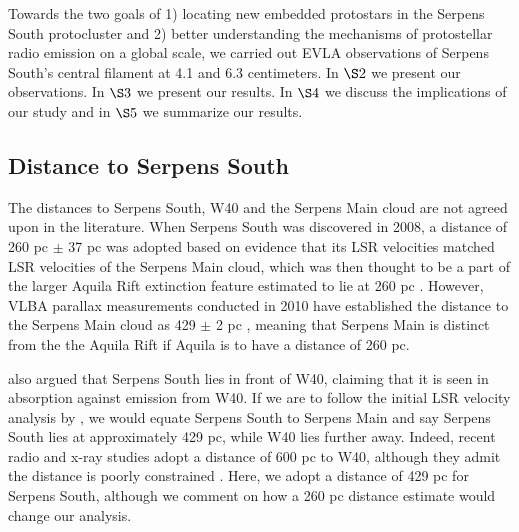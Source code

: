 \documentclass[apj]{emulateapj}
\begin{document}
	Towards the two goals of 1) locating new embedded protostars in the Serpens South protocluster and 2) better understanding the mechanisms of protostellar radio emission on a global scale, we carried out EVLA observations of Serpens South's central filament at 4.1 and 6.3 centimeters. In $\S 2$ we present our observations. In $\S 3$ we present our results. In $\S 4$ we discuss the implications of our study and in $\S 5$ we summarize our results.


\subsection{Distance to Serpens South}
\label{subsec:distance to serpens south}

The distances to Serpens South, W40 and the Serpens Main cloud are not agreed upon in the literature. When Serpens South was discovered in 2008, a distance of 260 pc $\pm$ 37 pc was adopted based on evidence that its LSR velocities matched LSR velocities of the Serpens Main cloud, which was then thought to be a part of the larger Aquila Rift extinction feature estimated to lie at 260 pc \citep{Straizys03}. However, VLBA parallax measurements conducted in 2010 have established the distance to the Serpens Main cloud as 429 $\pm$ 2 pc \citep{Dzib11}, meaning that Serpens Main is distinct from the the Aquila Rift if Aquila is to have a distance of 260 pc. 

\citet{Gutermuth08} also argued that Serpens South lies in front of W40, claiming that it is seen in absorption against emission from W40. If we are to follow the initial LSR velocity analysis by \citet{Gutermuth08}, we would equate Serpens South to Serpens Main and say Serpens South lies at approximately 429 pc, while W40 lies further away. Indeed, recent radio and x-ray studies adopt a distance of 600 pc to W40, although they admit the distance is poorly constrained \citep{Kuhn10, Rodriguez10}. Here, we adopt a distance of 429 pc for Serpens South, although we comment on how a 260 pc distance estimate would change our analysis.






\end{document}
